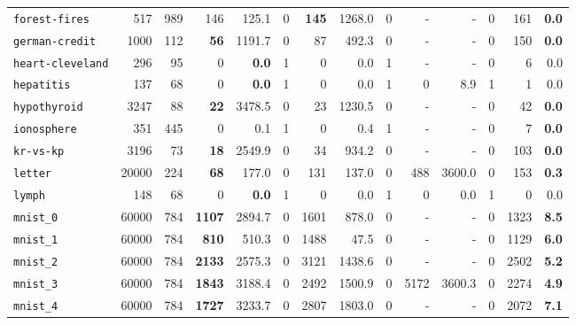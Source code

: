 \begin{tabular}{lccrrrrrrrrrrr}
\texttt{forest-fires} & \multicolumn{1}{r}{517} & \multicolumn{1}{r}{989}  & 146 & 125.1 & 0 & \textbf{145} & 1268.0 & 0 & - & - & 0 & 161 & \textbf{0.0}\\
\texttt{german-credit} & \multicolumn{1}{r}{1000} & \multicolumn{1}{r}{112}  & \textbf{56} & 1191.7 & 0 & 87 & 492.3 & 0 & - & - & 0 & 150 & \textbf{0.0}\\
\texttt{heart-cleveland} & \multicolumn{1}{r}{296} & \multicolumn{1}{r}{95}  & 0 & \textbf{0.0} & 1 & 0 & 0.0 & 1 & - & - & 0 & 6 & 0.0\\
\texttt{hepatitis} & \multicolumn{1}{r}{137} & \multicolumn{1}{r}{68}  & 0 & \textbf{0.0} & 1 & 0 & 0.0 & 1 & 0 & 8.9 & 1 & 1 & 0.0\\
\texttt{hypothyroid} & \multicolumn{1}{r}{3247} & \multicolumn{1}{r}{88}  & \textbf{22} & 3478.5 & 0 & 23 & 1230.5 & 0 & - & - & 0 & 42 & \textbf{0.0}\\
\texttt{ionosphere} & \multicolumn{1}{r}{351} & \multicolumn{1}{r}{445}  & 0 & 0.1 & 1 & 0 & 0.4 & 1 & - & - & 0 & 7 & \textbf{0.0}\\
\texttt{kr-vs-kp} & \multicolumn{1}{r}{3196} & \multicolumn{1}{r}{73}  & \textbf{18} & 2549.9 & 0 & 34 & 934.2 & 0 & - & - & 0 & 103 & \textbf{0.0}\\
\texttt{letter} & \multicolumn{1}{r}{20000} & \multicolumn{1}{r}{224}  & \textbf{68} & 177.0 & 0 & 131 & 137.0 & 0 & 488 & 3600.0 & 0 & 153 & \textbf{0.3}\\
\texttt{lymph} & \multicolumn{1}{r}{148} & \multicolumn{1}{r}{68}  & 0 & \textbf{0.0} & 1 & 0 & 0.0 & 1 & 0 & 0.0 & 1 & 0 & 0.0\\
\texttt{mnist\_0} & \multicolumn{1}{r}{60000} & \multicolumn{1}{r}{784}  & \textbf{1107} & 2894.7 & 0 & 1601 & 878.0 & 0 & - & - & 0 & 1323 & \textbf{8.5}\\
\texttt{mnist\_1} & \multicolumn{1}{r}{60000} & \multicolumn{1}{r}{784}  & \textbf{810} & 510.3 & 0 & 1488 & 47.5 & 0 & - & - & 0 & 1129 & \textbf{6.0}\\
\texttt{mnist\_2} & \multicolumn{1}{r}{60000} & \multicolumn{1}{r}{784}  & \textbf{2133} & 2575.3 & 0 & 3121 & 1438.6 & 0 & - & - & 0 & 2502 & \textbf{5.2}\\
\texttt{mnist\_3} & \multicolumn{1}{r}{60000} & \multicolumn{1}{r}{784}  & \textbf{1843} & 3188.4 & 0 & 2492 & 1500.9 & 0 & 5172 & 3600.3 & 0 & 2274 & \textbf{4.9}\\
\texttt{mnist\_4} & \multicolumn{1}{r}{60000} & \multicolumn{1}{r}{784}  & \textbf{1727} & 3233.7 & 0 & 2807 & 1803.0 & 0 & - & - & 0 & 2072 & \textbf{7.1}\\

\end{tabular}
